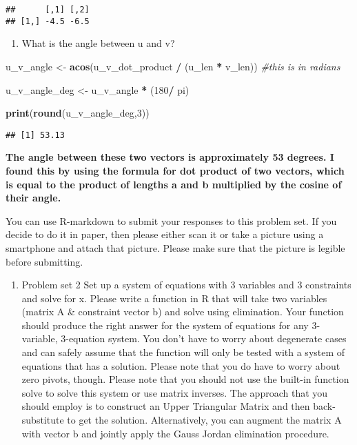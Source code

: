 \documentclass[
]{article}
\newenvironment{Shaded}{\begin{snugshade}}{\end{snugshade}}
\newcommand{\CommentTok}[1]{\textcolor[rgb]{0.56,0.35,0.01}{\textit{#1}}}
\newcommand{\DecValTok}[1]{\textcolor[rgb]{0.00,0.00,0.81}{#1}}
\newcommand{\KeywordTok}[1]{\textcolor[rgb]{0.13,0.29,0.53}{\textbf{#1}}}
\newcommand{\NormalTok}[1]{#1}
\newcommand{\OperatorTok}[1]{\textcolor[rgb]{0.81,0.36,0.00}{\textbf{#1}}}
\newcommand{\StringTok}[1]{\textcolor[rgb]{0.31,0.60,0.02}{#1}}
\providecommand{\tightlist}{%
  \setlength{\itemsep}{0pt}\setlength{\parskip}{0pt}}
\begin{document}
\begin{verbatim}
##      [,1] [,2]
## [1,] -4.5 -6.5
\end{verbatim}

\begin{enumerate}
\def\labelenumi{(\arabic{enumi})}
\setcounter{enumi}{3}
\tightlist
\item
  What is the angle between u and v?
\end{enumerate}

\begin{Shaded}
\begin{Highlighting}[]
\NormalTok{u\_v\_angle \textless{}{-}}\StringTok{ }\KeywordTok{acos}\NormalTok{(u\_v\_dot\_product }\OperatorTok{/}\StringTok{ }\NormalTok{(u\_len }\OperatorTok{*}\StringTok{ }\NormalTok{v\_len)) }\CommentTok{\#this is in radians}

\NormalTok{u\_v\_angle\_deg \textless{}{-}}\StringTok{ }\NormalTok{u\_v\_angle }\OperatorTok{*}\StringTok{ }\NormalTok{(}\DecValTok{180}\OperatorTok{/}\StringTok{ }\NormalTok{pi)}

\KeywordTok{print}\NormalTok{(}\KeywordTok{round}\NormalTok{(u\_v\_angle\_deg,}\DecValTok{3}\NormalTok{))}
\end{Highlighting}
\end{Shaded}

\begin{verbatim}
## [1] 53.13
\end{verbatim}

\textbf{The angle between these two vectors is approximately 53 degrees.
I found this by using the formula for dot product of two vectors, which
is equal to the product of lengths a and b multiplied by the cosine of
their angle.}

You can use R-markdown to submit your responses to this problem set. If
you decide to do it in paper, then please either scan it or take a
picture using a smartphone and attach that picture. Please make sure
that the picture is legible before submitting.

\begin{enumerate}
\def\labelenumi{\arabic{enumi}.}
\setcounter{enumi}{1}
\tightlist
\item
  Problem set 2 Set up a system of equations with 3 variables and 3
  constraints and solve for x. Please write a function in R that will
  take two variables (matrix A \& constraint vector b) and solve using
  elimination. Your function should produce the right answer for the
  system of equations for any 3-variable, 3-equation system. You don't
  have to worry about degenerate cases and can safely assume that the
  function will only be tested with a system of equations that has a
  solution. Please note that you do have to worry about zero pivots,
  though. Please note that you should not use the built-in function
  solve to solve this system or use matrix inverses. The approach that
  you should employ is to construct an Upper Triangular Matrix and then
  back-substitute to get the solution. Alternatively, you can augment
  the matrix A with vector b and jointly apply the Gauss Jordan
  elimination procedure.
\end{enumerate}
\end{document}
